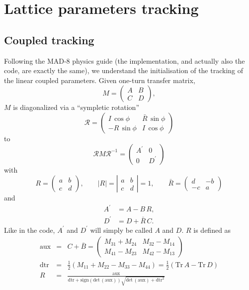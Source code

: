 \documentclass{cern-art} %
\begin{document}
\section{Lattice parameters tracking}
\subsection{Coupled tracking}
Following the MAD-8 physics guide (the implementation, and actually also the code, are exactly the same), we understand the initialisation of the tracking of the linear coupled parameters. Given one-turn transfer matrix,
$$M=\left(\begin{array}{cc}
A & B\\
C & D
\end{array}\right),$$
$M$ is diagonalized via a ``sympletic rotation'' $$\mathcal{R}=\left(\begin{array}{cc}
I\,\cos\phi & \bar{R}\,\sin\phi\\
-R\,\sin\phi & I\,\cos\phi
\end{array}\right)$$
to
$$\mathcal{R}M\mathcal{R}^{-1}=\left(\begin{array}{cc}
A^{\prime} & 0\\
0 & D^{\prime}
\end{array}\right)$$
with
$$R=\left(\begin{array}{cc}
a & b\\
c & d
\end{array}\right),\qquad\left|R\right|=\left|\begin{array}{cc}
a & b\\
c & d
\end{array}\right|=1,\qquad\bar{R}=\left(\begin{array}{cc}
d & -b\\
-c & a
\end{array}\right)
$$
and
$$\begin{aligned}A^{\prime} & =A-B\, R,\\
D^{\prime} & =D+\bar{R}\, C.
\end{aligned}$$
Like in the code, $A^{\prime}$ and $D^{\prime}$ will simply be called $A$ and $D$. $R$ is defined as
\begin{eqnarray*}
\text{aux} & = & C+\bar{B}=\left(\begin{array}{cc}
M_{31}+M_{24} & M_{32}-M_{14}\\
M_{41}-M_{23} & M_{42}-M_{13}
\end{array}\right)\\
\text{dtr} & = & \frac{1}{2}\left(M_{11}+M_{22}-M_{33}-M_{44}\right)=\frac{1}{2}\left(\mathrm{Tr}\, A-\mathrm{Tr}\, D\right)\\
R & = & \frac{\text{aux}}{\text{dtr}+\mathrm{sign}\left(\mathrm{det}\,\left(\text{aux}\right)\right)\sqrt{\mathrm{det}\,\left(\text{aux}\right)+\text{dtr}^{2}}}
\end{eqnarray*}
\end{document}
